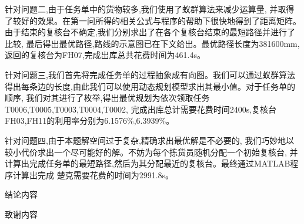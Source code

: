 \documentclass[12pt]{thesis-NJFU}
\begin{document}
针对问题二,由于任务单中的货物较多,我们使用了蚁群算法来减少运算量,
并取得了较好的效果。在第一问所得的相关公式与程序的帮助下很快地得到了距离矩阵。
由于结束的复核台不确定,我们分别求出了在各个复核台结束的最短路径并进行了比较,
最后得出最优路径,路线的示意图已在下文给出。最优路径长度为381600mm,
返回的复核台为FH07,完成出库总共花费时间为461.4s。

针对问题三,我们首先将完成任务单的过程抽象成有向图。我们可以通过蚁群算法
得出每条边的长度,由此我们可以使用动态规划模型求出其最小值。对于任务单的顺序,
我们对其进行了枚举,得出最优规划为依次领取任务T0006,T0005,T0003,T0004,T0002,
完成出库总计需要花费时间2400s,复核台FH03,FH11的利用率分别为6.1576\%,6.3939\%。

针对问题四,由于本题解空间过于复杂,精确求出最优解是不必要的,
我们巧妙地以较小代价求出一个尽可能好的解。不妨为每个拣货员随机分配一个初始复核台,
并计算出完成任务单的最短路径,然后为其分配最近的复核台。最终通过MATLAB程序计算出完成
楚克需要花费的时间为2991.8s。

\conclusion
结论内容

\acknowledgement
致谢内容

\thesisreferences
\end{document}
